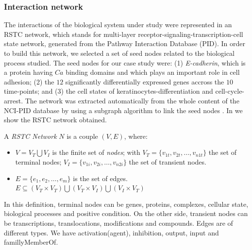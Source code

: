 \subsubsection{Interaction network}
\label{ssec:RSTC}
The interactions of the biological system under study were represented in
 an RSTC network, which stands for  multi-layer receptor-signaling-transcription-cell state network, generated from the Pathway Interaction Database (PID).
In order to build this network, we selected a set of seed nodes related to the biological process studied.
The seed nodes for our case study were:  (1) \emph{E-cadherin}, which is a protein having $Ca$ binding domains and which plays an important role in cell adhesion;
(2) the $12$ significantly differentially expressed genes accross the $10$ time-points; and (3) the cell states of keratinocytes-differentiation and cell-cycle-arrest. 
The network was extracted automatically from the whole content of the NCI-PID database by using a subgraph algorithm to link the seed nodes \cite{guziolowski2012automatic}. 
In  we show the RSTC network obtained. 

\begin{definition} \label{def:RSTCDef}
A \emph{RSTC Network} $N$ is a couple $(V,E)$, where:
\begin{itemize}
\item $V =V_{T} \bigcup V_{I} $ is the finite set of \emph{nodes};
 with 
  $V_{T} = \{v_{1t},v_{2t}, \dots ,v_{n1t} \} $ the set of terminal nodes;
  $V_{I} = \{v_{1i},v_{2i}, \dots ,v_{n2i} \} $ the set of transient nodes.
\item $E = \{e_{1},e_{2}, \dots, e_{m} \}$ is the set of edges. $ E \subseteq (V_{T} \times V_{T}) \bigcup (V_{T} \times V_{I}) 
\bigcup (V_{I} \times V_{T})$
\end{itemize}
\end{definition}

In this definition, terminal nodes can be genes, proteins, complexes, cellular state, biological processes and positive condition. 
On the other side, transient nodes can be transcriptions, translocations, modifications and compounds. Edges are of different types.
We have activation(agent), inhibition, output, input and famillyMemberOf.

